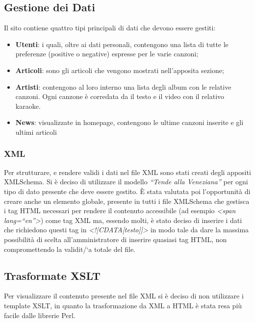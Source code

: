 \subsection{Gestione dei Dati}
Il sito contiene quattro tipi principali di dati che devono essere gestiti:
\begin{itemize}
    \item \textbf{Utenti}: i quali, oltre ai dati personali, contengono una lista di tutte le preferenze (positive o negative) espresse per le varie canzoni;
    \item \textbf{Articoli}: sono gli articoli che vengono mostrati nell'apposita sezione;
    \item \textbf{Artisti}: contengono al loro interno una lista degli album con le relative canzoni. Ogni canzone \`e corredata da il testo e il video con il relativo karaoke.
    \item \textbf{News}: visualizzate in homepage, contengono le ultime canzoni inserite e gli ultimi articoli
\end{itemize}

\subsubsection{XML}

Per strutturare, e rendere validi i dati nel file XML sono stati creati degli appositi XMLSchema.
Si \`e deciso di utilizzare il modello \textit{``Tende alla Veneziana''} per ogni tipo di dato presente che deve essere gestito.
\`E stata valutata poi l'opportunit\`a di creare anche un elemento globale, presente in tutti i file XMLSchema che gestisca i tag HTML necessari per rendere il contenuto accessibile (ad esempio \textit{\textless span lang=``en''\textgreater}) come tag XML ma, essendo molti, \`e stato deciso di inserire i dati che richiedono questi tag in \textit{\textless![CDATA[testo]]\textgreater} in modo tale da dare la massima possibilit\`a di scelta all'amministratore di inserire quasiasi tag HTML, non compromettendo la validit/`a totale del file.

\subsection{Trasformate XSLT}

Per visualizzare il contenuto presente nel file XML si \`e deciso di non utilizzare i template XSLT, in quanto la trasformazione da XML a HTML \`e stata resa pi\`u facile dalle librerie Perl.
